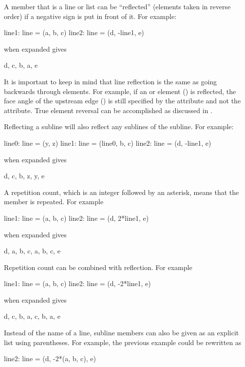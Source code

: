 A member that is a line or list can be ``reflected'' (elements taken in reverse order) if a negative
sign is put in front of it. For example:
\begin{example}
  line1: line = (a, b, c)
  line2: line = (d, -line1, e)
\end{example}
 when expanded gives
\begin{example}
  d, c, b, a, e
\end{example}
It is important to keep in mind that line reflection is  the same as going backwards through
elements. For example, if an  or  element () is reflected, the
face angle of the upstream edge () is still specified by the  attribute
and not the  attribute. True element reversal can be accomplished as discussed in .

Reflecting a subline will also reflect any sublines of the subline. For example:
\begin{example}
  line0: line = (y, z)
  line1: line = (line0, b, c)
  line2: line = (d, -line1, e)
\end{example}
 when expanded gives
\begin{example}
  d, c, b, z, y, e
\end{example}

A repetition count, which is an integer followed by an asterisk, 
means that the member is
repeated. For example
\begin{example}
  line1: line = (a, b, c)
  line2: line = (d, 2*line1, e)
\end{example}
 when expanded gives
\begin{example}
  d, a, b, c, a, b, c, e
\end{example}
Repetition count can be combined with reflection. For example
\begin{example}
  line1: line = (a, b, c)
  line2: line = (d, -2*line1, e)
\end{example}
 when expanded gives
\begin{example}
  d, c, b, a, c, b, a, e
\end{example}
Instead of the name of a line, subline members can also be given as an explicit list using
parentheses. For example, the previous example could be rewritten as
\begin{example}
  line2: line = (d, -2*(a, b, c), e)
\end{example}

